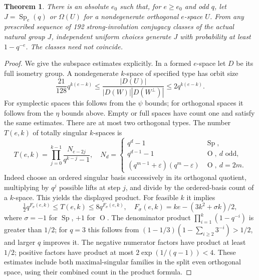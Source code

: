 \documentclass[11pt]{article}
\newtheorem{theorem}{Theorem}[section]
\newcommand{\Sp}{\operatorname{Sp}}
\newcommand{\Or}{\operatorname O}
\newcommand{\Om}{\Omega}
\newcommand{\eps}{\varepsilon}
\begin{document}
\begin{theorem}\label{classes}
There is an absolute $e_0$ such that, for $e\ge e_0$ and odd $q$, let $J=\Sp_e(q)$ or $\Om(U)$ for a nondegenerate orthogonal $e$-space $U$. From any prescribed sequence of 192 strong-involution conjugacy classes of the actual natural group $J$, independent uniform choices generate $J$ with probability at least $1-q^{-e}$. The classes need not coincide.
\end{theorem}
\begin{proof}
We give the subspace estimates explicitly. In a formed $e$-space let $D$ be its full isometry group. A nondegenerate $k$-space of specified type has orbit size
\begin{equation}\label{nondegcount}
\frac{21}{128}q^{k(e-k)}\le \frac{|D(U)|}{|D(W)||D(W^\perp)|}\le2q^{k(e-k)}.
\end{equation}
For symplectic spaces this follows from the $\psi$ bounds; for orthogonal spaces it follows from the $\eta$ bounds above. Empty or full spaces have count one and satisfy the same estimates. There are at most two orthogonal types. The number $T(e,k)$ of totally singular $k$-spaces is
\[
T(e,k)=\prod_{j=0}^{k-1}\frac{N_{e-2j}}{q^{k-j}-1},\quad
N_d=\begin{cases}q^d-1&\Sp,\\q^{d-1}-1&\Or,\ d\text{ odd},\\(q^{m-1}+\eps)(q^m-\eps)&\Or,\ d=2m.\end{cases}
\]
Indeed choose an ordered singular basis successively in its orthogonal quotient, multiplying by $q^j$ possible lifts at step $j$, and divide by the ordered-basis count of a $k$-space. This yields the displayed product. For feasible $k$ it implies
\begin{equation}\label{tscount}
\tfrac12 q^{F_\sigma(e,k)}\le T(e,k)\le8q^{F_\sigma(e,k)},\quad
F_\sigma(e,k)=ke-(3k^2+\sigma k)/2,
\end{equation}
where $\sigma=-1$ for $\Sp$, $+1$ for $\Or$. The denominator product $\prod_{i=1}^k(1-q^{-i})$ is greater than $1/2$; for $q=3$ this follows from $(1-1/3)(1-\sum_{i\ge2}3^{-i})>1/2$, and larger $q$ improves it. The negative numerator factors have product at least $1/2$; positive factors have product at most $2\exp(1/(q-1))<4$. These estimates include both maximal-singular families in the split even orthogonal space, using their combined count in the product formula.


\end{proof}
\end{document}
